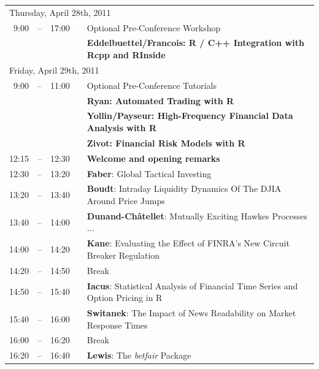 \documentclass[letterpaper,10pt]{article}
\newcommand{\mylinecolor}[1]{\color{#1}\vspace{-8pt}}  %
\begin{document}
\begin{tabular}{rlrlp{5in}}
\multicolumn{5}{l}{\large \color{Breaks}Thursday, April 28th, 2011} \\[10pt]
 9:00&\color{Breaks}-- & 17:00&   &\small{\mylinecolor{Breaks} Optional Pre-Conference Workshop} \\
     & &      &   &\textbf{\color{Breaks} Eddelbuettel/Francois: R / C++ Integration with Rcpp and RInside} \\[12pt]
\multicolumn{5}{l}{\large \color{Breaks}Friday, April 29th, 2011} \\[10pt]
 9:00&\color{Breaks}-- & 11:00&   &\small{\mylinecolor{Breaks} Optional Pre-Conference Tutorials} \\
     & &      &   &\textbf{\color{Breaks} Ryan: Automated Trading with R} \\
     & &      &   &\textbf{\color{Breaks} Yollin/Payseur: High-Frequency Financial Data Analysis with R} \\
     & &      &   &\textbf{\color{Breaks} Zivot: Financial Risk Models with R} \\
12:15&\color{Breaks}-- & 12:30&   &\textbf{\color{Breaks} Welcome and opening remarks} \\
12:30&\color{Breaks}-- & 13:20&   &\textbf{\color{KeynoteTalk} Faber}: \small{Global Tactical Investing} \\
13:20&\color{Breaks}-- & 13:40&   &\textbf{\color{Talk} Boudt}: \small{Intraday Liquidity Dynamics Of The DJIA Around Price Jumps} \\
13:40&\color{Breaks}-- & 14:00&   &\textbf{\color{Talk} Dunand-Ch\^{a}tellet}: \small{Mutually Exciting Hawkes Processes $\ldots$} \\
14:00&\color{Breaks}-- & 14:20&   &\textbf{\color{Talk} Kane}: \small{Evaluating the Effect of FINRA's New Circuit Breaker Regulation} \\
14:20&\color{Breaks}-- & 14:50&   &\small{\mylinecolor{Breaks} Break} \\
14:50&\color{Breaks}-- & 15:40&   &\textbf{\color{KeynoteTalk} Iacus}: \small{Statistical Analysis of Financial Time Series and Option Pricing in R} \\
15:40&\color{Breaks}-- & 16:00&   &\textbf{\color{Talk} Switanek}: \small{The Impact of News Readability on Market Response Times} \\
16:00&\color{Breaks}-- & 16:20&   &\small{\mylinecolor{Breaks} Break} \\
16:20&\color{Breaks}-- & 16:40&   &\textbf{\color{Talk} Lewis}: \small{The \emph{betfair} Package} \\

\end{tabular}
\end{document}
